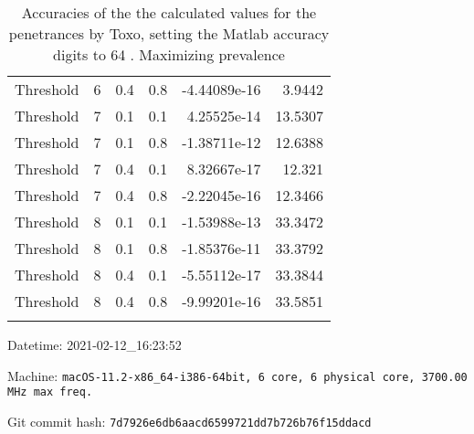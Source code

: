 \documentclass{article}
\begin{document}
\begin{longtable}[H]{lrrrrr}
 Threshold      &       6 &   0.4 &            0.8 &     -4.44089e-16 &          3.9442 \\
 Threshold      &       7 &   0.1 &            0.1 &      4.25525e-14 &         13.5307 \\
 Threshold      &       7 &   0.1 &            0.8 &     -1.38711e-12 &         12.6388 \\
 Threshold      &       7 &   0.4 &            0.1 &      8.32667e-17 &         12.321  \\
 Threshold      &       7 &   0.4 &            0.8 &     -2.22045e-16 &         12.3466 \\
 Threshold      &       8 &   0.1 &            0.1 &     -1.53988e-13 &         33.3472 \\
 Threshold      &       8 &   0.1 &            0.8 &     -1.85376e-11 &         33.3792 \\
 Threshold      &       8 &   0.4 &            0.1 &     -5.55112e-17 &         33.3844 \\
 Threshold      &       8 &   0.4 &            0.8 &     -9.99201e-16 &         33.5851 \\
\hline

\caption{Accuracies of the the calculated values for the penetrances by Toxo,
setting the Matlab accuracy digits to 64
. Maximizing prevalence}
\end{longtable}
Datetime: 2021-02-12\_16:23:52

Machine: \texttt{macOS-11.2-x86\_64-i386-64bit, 6 core, 6 physical core, 3700.00 MHz max freq.}

Git commit hash: \texttt{7d7926e6db6aacd6599721dd7b726b76f15ddacd}
\end{document}
